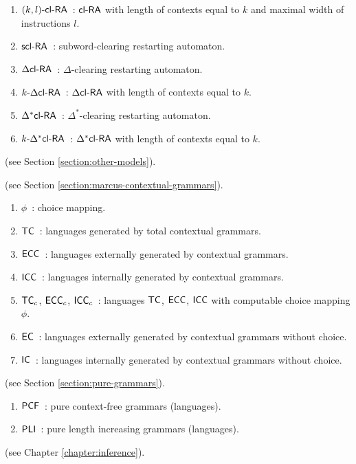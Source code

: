 \begin{enumerate}[]
\item $\textup{\sf $(k,l)$-\textup{\sf cl-RA\/}}$\ : $\textup{\sf cl-RA\/}$ with length of contexts equal to $k$ and maximal width of instructions $l$.
\item $\textup{\sf scl-RA}$\ : subword-clearing restarting automaton.
\item $\textup{\sf $\Delta$cl-RA\/}$\ : $\Delta$-clearing restarting automaton.
\item $\textup{\sf $k$-\textup{\sf $\Delta$cl-RA\/}}$\ : $\textup{\sf $\Delta$cl-RA\/}$ with length of contexts equal to $k$.
\item $\textup{\sf $\Delta^*$cl-RA\/}$\ : $\Delta^*$-clearing restarting automaton.
\item $\textup{\sf $k$-\textup{\sf $\Delta^*$cl-RA\/}}$\ : $\textup{\sf $\Delta^*$cl-RA\/}$ with length of contexts equal to $k$. 
\end{enumerate}

 (see Section \ref{section:other-models}).

 (see Section \ref{section:marcus-contextual-grammars}).

\begin{enumerate}[]
\item $\phi$\ : choice mapping.
\item $\textup{\sf TC}$\ : languages generated by total contextual grammars.
\item $\textup{\sf ECC}$\ : languages externally generated by contextual grammars.
\item $\textup{\sf ICC}$\ : languages internally generated by contextual grammars.
\item $\textup{\sf TC}_c$, $\textup{\sf ECC}_c$, $\textup{\sf ICC}_c$\ : languages $\textup{\sf TC}$, $\textup{\sf ECC}$, $\textup{\sf ICC}$ with computable choice mapping $\phi$.
\item $\textup{\sf EC}$\ : languages externally generated by contextual grammars without choice.
\item $\textup{\sf IC}$\ : languages internally generated by contextual grammars without choice.
\end{enumerate}

 (see Section \ref{section:pure-grammars}).

\begin{enumerate}[]
\item $\textup{\sf PCF}$\ : pure context-free grammars (languages).
\item $\textup{\sf PLI}$\ : pure length increasing grammars (languages).
\end{enumerate}

 (see Chapter \ref{chapter:inference}).

